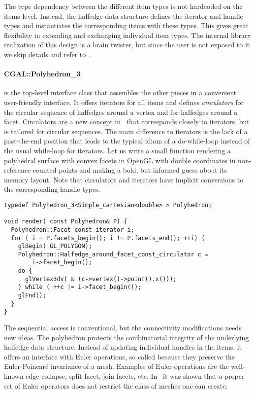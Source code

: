 The type dependency between the different item types is not hardcoded
on the items level. Instead, the halfedge data structure defines the
iterator and handle types and instantiates the corresponding items
with these types. This gives great flexibility in extending and
exchanging individual item types. The internal library
realization of this design is a brain twister, but since the user is
not exposed to it we skip details and refer to~\cite{k-ugpdd-99}.

\paragraph*{CGAL::Polyhedron\_3} is the top-level interface class that
assembles the other pieces in a convenient user-friendly interface.
It offers iterators for all items and defines \emph{circulators} for
the circular sequence of halfedges around a vertex and for halfedges
around a facet. Circulators are a new concept in \cgal\ that
corresponds closely to iterators, but is tailored for circular
sequences.  The main difference to iterators is the lack of a
past-the-end position that leads to the typical idiom of a
do-while-loop instead of the usual while-loop for iterators.  Let us
write a small function rendering a polyhedral surface with convex
facets in OpenGL with double coordinates in non-reference counted
points and making a bold, but informed guess about its memory layout.
Note that circulators and iterators have implicit conversions to the
corresponding handle types.
%
\begin{lstlisting}
typedef Polyhedron_3<Simple_cartesian<double> > Polyhedron;

void render( const Polyhedron& P) {
  Polyhedron::Facet_const_iterator i;
  for ( i = P.facets_begin(); i != P.facets_end(); ++i) {
    glBegin( GL_POLYGON);
    Polyhedron::Halfedge_around_facet_const_circulator c = 
        i->facet_begin();
    do {
      glVertex3dv( & (c->vertex()->point().x()));
    } while ( ++c != i->facet_begin());
    glEnd();
  }
}
\end{lstlisting}%
%
The sequential access is conventional, but the connectivity
modifications needs new ideas. The polyhedron protects the
combinatorial integrity of the underlying halfedge data structure.
Instead of updating individual handles in the items, it offers an
interface with Euler operations, so called because they preserve the
Euler-Poincar\'e invariance of a mesh. Examples of Euler operations
are the well-known edge collapse, split facet, join facets, etc.
In~\cite{Maentylae88} it was shown that a proper set of Euler
operators does not restrict the class of meshes one can create.


